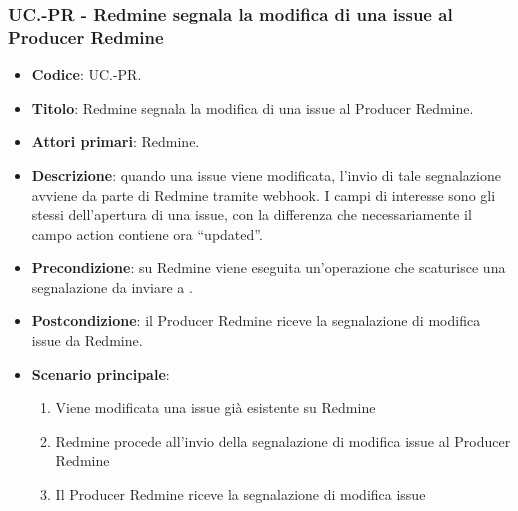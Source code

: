 \subsubsection{UC\theuccount.\thesubuccount-PR - Redmine segnala la modifica di una issue al Producer Redmine}
\begin{itemize}
	\item \textbf{Codice}: UC\theuccount.\thesubuccount-PR.
	\item \textbf{Titolo}: Redmine segnala la modifica di una issue al Producer Redmine.
	\item \textbf{Attori primari}: Redmine.
	\item \textbf{Descrizione}: quando una issue viene modificata, l'invio di tale segnalazione
	avviene da parte di Redmine tramite webhook.
	I campi di interesse sono gli stessi dell'apertura di una issue, con la differenza che necessariamente il campo action contiene ora ``updated''.
		\item \textbf{Precondizione}: su Redmine viene eseguita un'operazione che scaturisce una
    segnalazione da inviare a \progetto.
	\item \textbf{Postcondizione}: il Producer Redmine riceve la segnalazione di modifica issue da Redmine.
	\item \textbf{Scenario principale}:
	\begin{enumerate}
		\item Viene modificata una issue già esistente su Redmine
		\item Redmine procede all'invio della segnalazione di modifica issue al Producer Redmine
        \item Il Producer Redmine riceve la segnalazione di modifica issue
	\end{enumerate}

\end{itemize}


